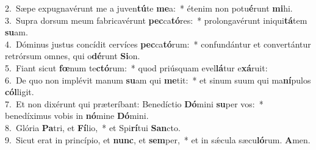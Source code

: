 {2.~}Sæpe expugnavérunt me a juven\textbf{tú}te \textbf{me}a:~* étenim non potu\textbf{é}runt \textbf{mi}hi.\\
{3.~}Supra dorsum meum fabricavérunt \textbf{pec}ca\textbf{tó}res:~* prolongavérunt iniqui\textbf{tá}tem \textbf{su}am.\\
{4.~}Dóminus justus concídit cervíces \textbf{pec}ca\textbf{tó}rum:~* confundántur et convertántur retrórsum omnes, qui o\textbf{dé}runt \textbf{Si}on.\\
{5.~}Fiant sicut \textbf{fœ}num te\textbf{ctó}rum:~* quod priúsquam evel\textbf{lá}tur e\textbf{xá}ruit:\\
{6.~}De quo non implévit manum \textbf{su}am qui \textbf{me}tit:~* et sinum suum qui ma\textbf{ní}pulos \textbf{cól}ligit.\\
{7.~}Et non dixérunt qui præteríbant: Benedíctio \textbf{Dó}mini \textbf{su}per vos:~* benedíximus vobis in \textbf{nó}mine \textbf{Dó}mini.\\
{8.~}Glória \textbf{Pa}tri, et \textbf{Fí}lio,~* et Spi\textbf{rí}tui \textbf{San}cto.\\
{9.~}Sicut erat in princípio, et \textbf{nunc}, et \textbf{sem}per,~* et in sǽcula sæcu\textbf{ló}rum. \textbf{A}men.\\
